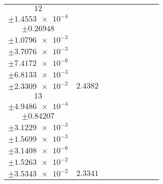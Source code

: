 \documentclass[8pt]{article}
\begin{document}
\begin{longtable}[l]{c c c c c c c c c}
$\num{12}$ & \begin{tabular}[c]{@{}c@{}}$\num{3.0915e-2}$ \\ $\pm\num{1.4553e-4}$\end{tabular} & \begin{tabular}[c]{@{}c@{}}$\num{-0.85558}$ \\ $\pm\num{0.26948}$\end{tabular} & \begin{tabular}[c]{@{}c@{}}$\num{-11.307}$ \\ $\pm\num{1.0796e-3}$\end{tabular} & \begin{tabular}[c]{@{}c@{}}$\num{1.5981e+3}$ \\ $\pm\num{3.7076e-3}$\end{tabular} & \begin{tabular}[c]{@{}c@{}}$\num{3.1971}$ \\ $\pm\num{7.4172e-6}$\end{tabular} & \begin{tabular}[c]{@{}c@{}}$\num{1.1936}$ \\ $\pm\num{6.8133e-3}$\end{tabular} & \begin{tabular}[c]{@{}c@{}}$\num{4.2735}$ \\ $\pm\num{2.3309e-2}$\end{tabular} & $\num{2.4382}$\\
$\num{13}$ & \begin{tabular}[c]{@{}c@{}}$\num{2.7479e-2}$ \\ $\pm\num{4.9486e-4}$\end{tabular} & \begin{tabular}[c]{@{}c@{}}$\num{-1.0087}$ \\ $\pm\num{0.84207}$\end{tabular} & \begin{tabular}[c]{@{}c@{}}$\num{-7.094}$ \\ $\pm\num{3.1229e-3}$\end{tabular} & \begin{tabular}[c]{@{}c@{}}$\num{1.6023e+3}$ \\ $\pm\num{1.5699e-3}$\end{tabular} & \begin{tabular}[c]{@{}c@{}}$\num{3.2055}$ \\ $\pm\num{3.1408e-6}$\end{tabular} & \begin{tabular}[c]{@{}c@{}}$\num{1.1161}$ \\ $\pm\num{1.5263e-2}$\end{tabular} & \begin{tabular}[c]{@{}c@{}}$\num{3.9859}$ \\ $\pm\num{3.5343e-2}$\end{tabular} & $\num{2.3341}$\\

\end{longtable}
\end{document}
